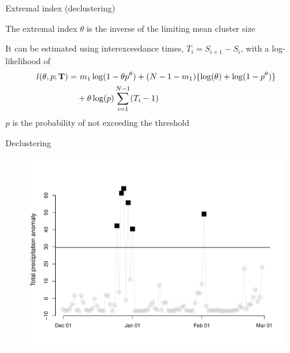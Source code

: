 \documentclass[mathserif, 11pt, t]{beamer}
\begin{document}
\begin{frame}{Extremal index (declustering)}

The extremal index $\theta$ is the inverse of the limiting mean cluster size
\bigskip

It can be estimated using interexceedance times, $T_i = S_{i+1} - S_i$, with a log-likelihood of
\begin{align*}
l(\theta, p; \mathbf{\bm{T}}) =&~ m_1\log(1-\theta p^\theta) + (N-1-m_1)\{\log(\theta)+ \log(1-p^\theta)\} \nonumber \\
 &+ \theta\log(p)\sum_{i=1}^{N-1}(T_i-1)
\end{align*}
$p$ is the probability of not exceeding the threshold

\end{frame}



\begin{frame}{Declustering}
\begin{figure}
\begin{center}
\includegraphics[scale=0.38]{figs/threshold.pdf}
\end{center}
\end{figure}
\end{frame}
\end{document}
